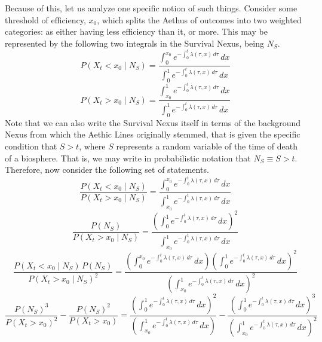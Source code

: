 Because of this, let us analyze one specific notion of such things. Consider some threshold of efficiency, $x_0$, which splits the Aethus of outcomes into two weighted categories: as either having less efficiency than it, or more. This may be represented by the following two integrals in the Survival Nexus, being $N_S$.
\begin{equation}
     P \left( X_t < x_0 \mid N_S \right) = \frac{\int_0^{x_0} e^{-\int_0^{t} \lambda \left( \tau, x \right) \, d\tau} \, dx}{\int_0^1 e^{-\int_0^{t} \lambda \left( \tau, x \right) \, d\tau} \, dx}
\end{equation}
\begin{equation}
     P \left( X_t > x_0 \mid N_S \right) = \frac{\int_{x_0}^1 e^{-\int_0^{t} \lambda \left( \tau, x \right) \, d\tau} \, dx}{\int_0^1 e^{-\int_0^{t} \lambda \left( \tau, x \right) \, d\tau} \, dx}
\end{equation}
Note that we can also write the Survival Nexus itself in terms of the background Nexus from which the Aethic Lines originally stemmed, that is given the specific condition that $S > t$, where $S$ represents a random variable of the time of death of a biosphere. That is, we may write in probabilistic notation that $N_S \equiv S > t$. Therefore, now consider the following set of statements.
\begin{equation}
    \frac{P \! \left( X_t < x_0 \mid N_S \right)}{P \! \left( X_t > x_0 \mid N_S \right)} = \frac{\int_0^{x_0} e^{-\int_0^{t} \lambda \left( \tau, x \right) \, d\tau} \, dx}{\int_{x_0}^1 e^{-\int_0^{t} \lambda \left( \tau, x \right) \, d\tau} \, dx}
\end{equation}
\begin{equation}
    \frac{P \! \left( N_S \right)}{P \! \left( X_t > x_0 \mid N_S \right)} = \frac{{\left(\int_0^1 e^{-\int_0^{t} \lambda \left( \tau, x \right) \, d\tau} \, dx \right)}^2}{\int_{x_0}^1 e^{-\int_0^{t} \lambda \left( \tau, x \right) \, d\tau} \, dx}
\end{equation}
\begin{equation}
    \frac{P \! \left( X_t < x_0 \mid N_S \right) \, P \! \left( N_S \right)}{{ P \left( X_t > x_0 \mid N_S \right)}^2} = \frac{\left( \int_0^{x_0} e^{-\int_0^{t} \lambda \left( \tau, x \right) \, d\tau} \, dx\right) {\left(\int_0^1 e^{-\int_0^{t} \lambda \left( \tau, x \right) \, d\tau} \, dx \right)}^2 }{{\left( \int_{x_0}^1 e^{-\int_0^{t} \lambda \left( \tau, x \right) \, d\tau} \, dx \right)}^2}
\end{equation}
\begin{equation}
    \frac{{P \! \left( N_S \right)} ^ 3}{{ P \! \left( X_t > x_0 \right)}^2} - \frac{{P \! \left( N_S \right)} ^ 2}{ P \! \left( X_t > x_0 \right)} = \frac{{\left(\int_0^1 e^{-\int_0^{t} \lambda \left( \tau, x \right) \, d\tau} \, dx \right)}^2}{{\left( \int_{x_0}^1 e^{-\int_0^{t} \lambda \left( \tau, x \right) \, d\tau} \, dx \right)}} - \frac{{\left(\int_0^1 e^{-\int_0^{t} \lambda \left( \tau, x \right) \, d\tau} \, dx \right)}^3}{{\left( \int_{x_0}^1 e^{-\int_0^{t} \lambda \left( \tau, x \right) \, d\tau} \, dx \right)}^2}
\end{equation}
